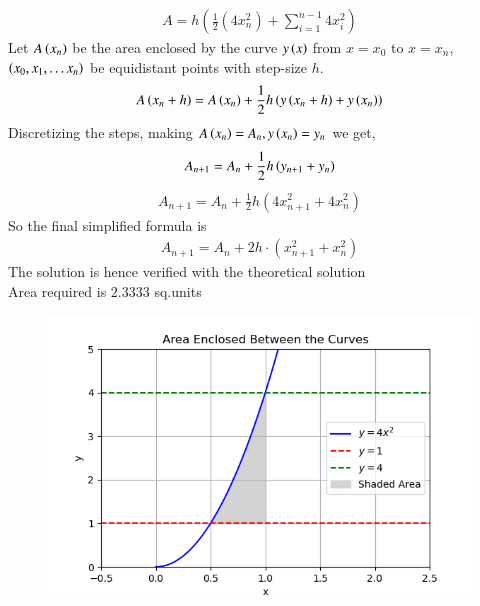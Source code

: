 \documentclass[journal]{IEEEtran}
\begin{document}
\begin{align}
    A = h \left( \frac{1}{2} \left( 4x_n^2 \right) + \sum_{i=1}^{n-1} 4x_i^2 \right)
\end{align}
Let $A\left(x_n\right)$ be the area enclosed by the curve $y\left(x\right)$ from $x=x_0$ to $x=x_n$, $\left(x_0, x_1, \dots x_n\right)$ be equidistant points with step-size $h$.
\begin{align}
  A\left(x_n+h\right)=A\left(x_n\right)+\frac{1}{2}h\left(y\left(x_n+h\right)+y\left(x_n\right)\right)
\end{align}
Discretizing the steps, making $A\left(x_n\right)=A_n, y\left(x_n\right)=y_n$ we get,
\begin{align}
 A_{n+1}=A_n+\frac{1}{2}h\left(y_{n+1}+y_n\right)
\end{align}
\begin{align}
    A_{n+1} = A_n + \frac{1}{2} h \left( 4x_{n+1}^2 + 4x_n^2 \right)
\end{align}
So the final simplified formula is
\begin{align}
    A_{n+1} = A_n + 2h \cdot \left( x_{n+1}^2 + x_n^2 \right)
\end{align}
The solution is hence verified with the theoretical solution
\\
Area required is $2.3333$ sq.units
\begin{figure}
    \centering
    \includegraphics[width=\columnwidth]{figs/Figure_1.png}
\end{figure}
\end{document}
